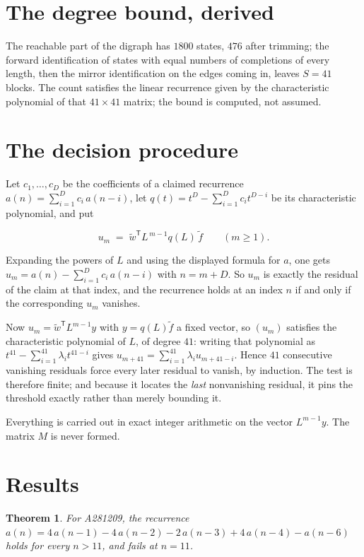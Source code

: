 \documentclass[11pt]{article}
\newtheorem{theorem}{Theorem}
\theoremstyle{definition}
\begin{document}
\section{The degree bound, derived}

The reachable part of the digraph has $1800$ states, $476$ after trimming; the forward identification of states with equal numbers of completions of every length, then the mirror identification on the edges coming in, leaves $S = 41$ blocks. The count satisfies the linear recurrence given by the characteristic polynomial of that $41\times41$ matrix; the bound is computed, not assumed.

\section{The decision procedure}

Let $c_1,\dots,c_D$ be the coefficients of a claimed recurrence $a(n) = \sum_{i=1}^{D} c_i\,a(n-i)$, let $q(t) = t^{D} - \sum_{i=1}^{D} c_i t^{D-i}$ be its characteristic polynomial, and put

\[u_m \;=\; \tilde w^{\mathsf T} L^{\,m-1} q(L)\,\tilde f \qquad (m \ge 1).\]

Expanding the powers of $L$ and using the displayed formula for $a$, one gets $u_m = a(n) - \sum_{i=1}^{D} c_i\,a(n-i)$ with $n = m + D$. So $u_m$ is exactly the residual of the claim at that index, and the recurrence holds at an index $n$ if and only if the corresponding $u_m$ vanishes.

Now $u_m = \tilde w^{\mathsf T} L^{m-1} y$ with $y = q(L)\tilde f$ a fixed vector, so $(u_m)$ satisfies the characteristic polynomial of $L$, of degree $41$: writing that polynomial as $t^{41} - \sum_{i=1}^{41} \lambda_i t^{41-i}$ gives $u_{m+41} = \sum_{i=1}^{41} \lambda_i u_{m+41-i}$. Hence $41$ consecutive vanishing residuals force every later residual to vanish, by induction. The test is therefore finite; and because it locates the {\itshape last} nonvanishing residual, it pins the threshold exactly rather than merely bounding it.

Everything is carried out in exact integer arithmetic on the vector $L^{m-1}y$. The matrix $M$ is never formed.

\section{Results}

\begin{theorem} For A281209, the recurrence $a(n) = 4\,a(n-1) - 4\,a(n-2) - 2\,a(n-3) + 4\,a(n-4) - a(n-6)$ holds for every $n > 11$, and fails at $n = 11$.\end{theorem}
\end{document}
